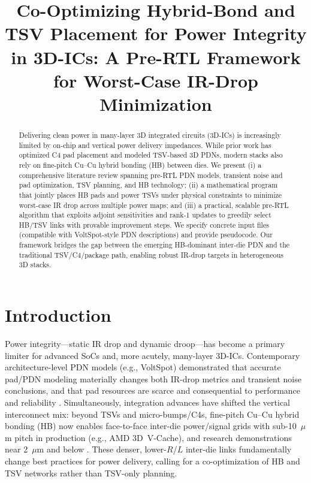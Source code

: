 \documentclass[conference]{IEEEtran}
\title{Co-Optimizing Hybrid-Bond and TSV Placement for Power Integrity in 3D-ICs: A Pre-RTL Framework for Worst-Case IR-Drop Minimization}
\author{
\IEEEauthorblockN{Anonymous}
\IEEEauthorblockA{Affiliation omitted for review}
}
\begin{document}
\maketitle

\begin{abstract}
Delivering clean power in many-layer 3D integrated circuits (3D-ICs) is increasingly limited by on-chip and vertical power delivery impedances. While prior work has optimized C4 pad placement and modeled TSV-based 3D PDNs, modern stacks also rely on fine-pitch Cu--Cu hybrid bonding (HB) between dies. We present (i) a comprehensive literature review spanning pre-RTL PDN models, transient noise and pad optimization, TSV planning, and HB technology; (ii) a mathematical program that jointly places HB pads and power TSVs under physical constraints to minimize worst-case IR drop across multiple power maps; and (iii) a practical, scalable pre-RTL algorithm that exploits adjoint sensitivities and rank-1 updates to greedily select HB/TSV links with provable improvement steps. We specify concrete input files (compatible with VoltSpot-style PDN descriptions) and provide pseudocode. Our framework bridges the gap between the emerging HB-dominant inter-die PDN and the traditional TSV/C4/package path, enabling robust IR-drop targets in heterogeneous 3D stacks. 
\end{abstract}

\section{Introduction}
Power integrity---static IR drop and dynamic droop---has become a primary limiter for advanced SoCs and, more acutely, many-layer 3D-ICs. Contemporary architecture-level PDN models (e.g., VoltSpot) demonstrated that accurate pad/PDN modeling materially changes both IR-drop metrics and transient noise conclusions, and that pad resources are scarce and consequential to performance and reliability \cite{ZhangISCA2014,VoltSpot}. Simultaneously, integration advances have shifted the vertical interconnect mix: beyond TSVs and micro-bumps/C4s, fine-pitch Cu--Cu hybrid bonding (HB) now enables face-to-face inter-die power/signal grids with sub-10~$\mu$m pitch in production (e.g., AMD 3D~V-Cache), and research demonstrations near 2~$\mu$m and below \cite{TomsHC33,EVGHB,SonyECTC2025,IEEESpectrumHB}. These denser, lower-$R$/$L$ inter-die links fundamentally change best practices for power delivery, calling for a co-optimization of HB and TSV networks rather than TSV-only planning.
\end{document}
